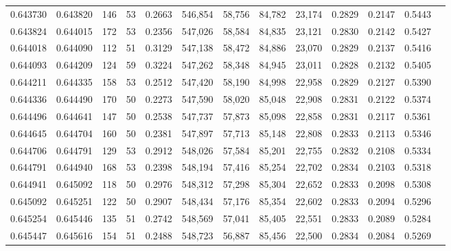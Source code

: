 \begin{tabular}{rrrrrrrrrrrrr}
0.643730 & 0.643820 &   146 &  53 &                                     0.2663 & 546,854 &  58,756 &  84,782 &  23,174 & 0.2829 & 0.2147 & 0.5443 \\
0.643824 & 0.644015 &   172 &  53 &                                     0.2356 & 547,026 &  58,584 &  84,835 &  23,121 & 0.2830 & 0.2142 & 0.5427 \\
0.644018 & 0.644090 &   112 &  51 &                                     0.3129 & 547,138 &  58,472 &  84,886 &  23,070 & 0.2829 & 0.2137 & 0.5416 \\
0.644093 & 0.644209 &   124 &  59 &                                     0.3224 & 547,262 &  58,348 &  84,945 &  23,011 & 0.2828 & 0.2132 & 0.5405 \\
0.644211 & 0.644335 &   158 &  53 &                                     0.2512 & 547,420 &  58,190 &  84,998 &  22,958 & 0.2829 & 0.2127 & 0.5390 \\
0.644336 & 0.644490 &   170 &  50 &                                     0.2273 & 547,590 &  58,020 &  85,048 &  22,908 & 0.2831 & 0.2122 & 0.5374 \\
0.644496 & 0.644641 &   147 &  50 &                                     0.2538 & 547,737 &  57,873 &  85,098 &  22,858 & 0.2831 & 0.2117 & 0.5361 \\
0.644645 & 0.644704 &   160 &  50 &                                     0.2381 & 547,897 &  57,713 &  85,148 &  22,808 & 0.2833 & 0.2113 & 0.5346 \\
0.644706 & 0.644791 &   129 &  53 &                                     0.2912 & 548,026 &  57,584 &  85,201 &  22,755 & 0.2832 & 0.2108 & 0.5334 \\
0.644791 & 0.644940 &   168 &  53 &                                     0.2398 & 548,194 &  57,416 &  85,254 &  22,702 & 0.2834 & 0.2103 & 0.5318 \\
0.644941 & 0.645092 &   118 &  50 &                                     0.2976 & 548,312 &  57,298 &  85,304 &  22,652 & 0.2833 & 0.2098 & 0.5308 \\
0.645092 & 0.645251 &   122 &  50 &                                     0.2907 & 548,434 &  57,176 &  85,354 &  22,602 & 0.2833 & 0.2094 & 0.5296 \\
0.645254 & 0.645446 &   135 &  51 &                                     0.2742 & 548,569 &  57,041 &  85,405 &  22,551 & 0.2833 & 0.2089 & 0.5284 \\
0.645447 & 0.645616 &   154 &  51 &                                     0.2488 & 548,723 &  56,887 &  85,456 &  22,500 & 0.2834 & 0.2084 & 0.5269 \\

\end{tabular}
